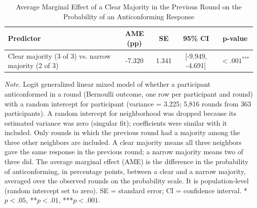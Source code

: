 \begin{table}[H]
\centering
\caption{Average Marginal Effect of a Clear Majority in the Previous Round on the Probability of an Anticonforming Response}
\label{tab:ame_antic_clearmaj}
\begingroup
\footnotesize
\renewcommand{\arraystretch}{0.90}

\begin{tabularx}{\linewidth}{Xcccc}
\toprule
\textbf{Predictor} & \textbf{AME (pp)} & \textbf{SE} & \textbf{95\% CI} & \textbf{p-value} \\
\midrule
Clear majority (3 of 3) vs. narrow majority (2 of 3) & -7.320 & 1.341 & [-9.949, -4.691] & $< .001^{\text{***}}$ \\
\bottomrule
\end{tabularx}

\vspace{0.6em}
{\footnotesize
\setlength{\baselineskip}{12pt}
\textit{Note.} Logit generalized linear mixed model of whether a participant anticonformed in a round (Bernoulli outcome, one row per participant and round) with a random intercept for participant (variance = 3.225; 5,816 rounds from 363 participants). A random intercept for neighborhood was dropped because its estimated variance was zero (singular fit); coefficients were similar with it included. Only rounds in which the previous round had a majority among the three other neighbors are included. A clear majority means all three neighbors gave the same response in the previous round; a narrow majority means two of three did. The average marginal effect (AME) is the difference in the probability of anticonforming, in percentage points, between a clear and a narrow majority, averaged over the observed rounds on the probability scale. It is population-level (random intercept set to zero). SE = standard error; CI = confidence interval. *$p < .05$, **$p < .01$, ***$p < .001$.
\par}
\endgroup
\end{table}
